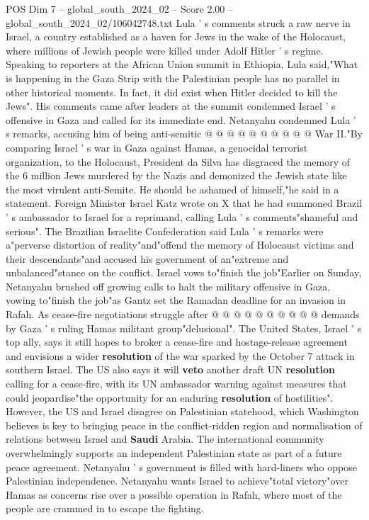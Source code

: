 \begin{textsample}{POS Dim 7 – global\_south\_2024\_02 – Score 2.00 – global\_south\_2024\_02/106042748.txt}
Lula ' s comments struck a raw nerve in Israel, a country established as a haven for Jews in the wake of the Holocaust, where millions of Jewish people were killed under Adolf Hitler ' s regime.
Speaking to reporters at the African Union summit in Ethiopia, Lula said,"What is happening in the Gaza Strip with the Palestinian people has no parallel in other historical moments.
In fact, it did exist when Hitler decided to kill the Jews".
His comments came after leaders at the summit condemned Israel ' s offensive in Gaza and called for its immediate end.
Netanyahu condemned Lula ' s remarks, accusing him of being anti-semitic @ @ @ @ @ @ @ @ @ @ War II."By comparing Israel ' s war in Gaza against Hamas, a genocidal terrorist organization, to the Holocaust, President da Silva has disgraced the memory of the 6 million Jews murdered by the Nazis and demonized the Jewish state like the most virulent anti-Semite.
He should be ashamed of himself,"he said in a statement.
Foreign Minister Israel Katz wrote on X that he had summoned Brazil ' s ambassador to Israel for a reprimand, calling Lula ' s comments"shameful and serious".
The Brazilian Israelite Confederation said Lula ' s remarks were a"perverse distortion of reality"and"offend the memory of Holocaust victims and their descendants"and accused his government of an"extreme and unbalanced"stance on the conflict.
Israel vows to"finish the job"Earlier on Sunday, Netanyahu brushed off growing calls to halt the military offensive in Gaza, vowing to"finish the job"as Gantz set the Ramadan deadline for an invasion in Rafah.
As cease-fire negotiations struggle after @ @ @ @ @ @ @ @ @ @ demands by Gaza ' s ruling Hamas militant group"delusional".
The United States, Israel ' s top ally, says it still hopes to broker a cease-fire and hostage-release agreement and envisions a wider \textbf{resolution} of the war sparked by the October 7 attack in southern Israel.
The US also says it will \textbf{veto} another draft UN \textbf{resolution} calling for a cease-fire, with its UN ambassador warning against measures that could jeopardise"the opportunity for an enduring \textbf{resolution} of hostilities".
However, the US and Israel disagree on Palestinian statehood, which Washington believes is key to bringing peace in the conflict-ridden region and normalisation of relations between Israel and \textbf{Saudi} Arabia.
The international community overwhelmingly supports an independent Palestinian state as part of a future peace agreement.
Netanyahu ' s government is filled with hard-liners who oppose Palestinian independence.
Netanyahu wants Israel to achieve"total victory"over Hamas as concerns rise over a possible operation in Rafah, where most of the people are crammed in to escape the fighting.

\end{textsample}
